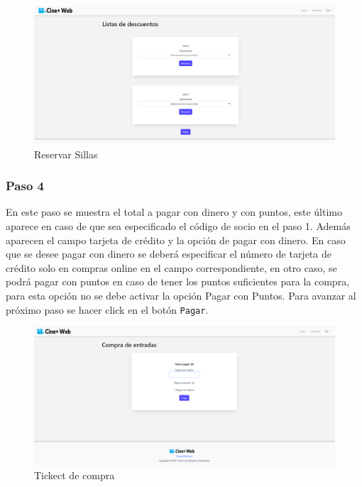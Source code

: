 \begin{figure}[h!]
	\centering
	\includegraphics[scale=0.35]{./chapters/img/reserve.png}
	
	\label{fig:reserve}
	\caption{Reservar Sillas}
\end{figure}

\subsubsection{Paso 4}
En este paso se muestra el total a pagar con dinero y con puntos, este \'ultimo aparece en caso de que sea especificado el c\'odigo de socio en el paso 1. Adem\'as aparecen el campo tarjeta de cr\'edito y la opci\'on de pagar con dinero. En caso que se desee pagar con dinero se deber\'a especificar el n\'umero de tarjeta de cr\'edito solo en compras online en el campo correspondiente, en otro caso, se podr\'a pagar con puntos en caso de tener los puntos suficientes para la compra, para esta opci\'on no se debe activar la opci\'on  Pagar con Puntos. Para avanzar al pr\'oximo paso se hacer click en el bot\'on \verb*|Pagar|.

\begin{figure}[h!]
	\centering
	\includegraphics[scale=0.35]{./chapters/img/ticketpurchase2.png}
	
	\label{fig:ticketpurchase2}
	\caption{Tickect de compra}
	
\end{figure}


